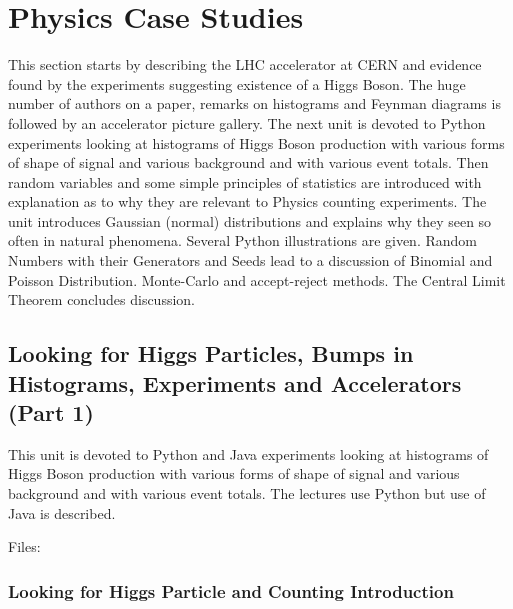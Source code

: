 

\section{Physics Case Studies}\label{physics-case-study}

\FILENAME

This section starts by describing the LHC accelerator at CERN and
evidence found by the experiments suggesting existence of a Higgs Boson.
The huge number of authors on a paper, remarks on histograms and Feynman
diagrams is followed by an accelerator picture gallery. The next unit is
devoted to Python experiments looking at histograms of Higgs Boson
production with various forms of shape of signal and various background
and with various event totals. Then random variables and some simple
principles of statistics are introduced with explanation as to why they
are relevant to Physics counting experiments. The unit introduces
Gaussian (normal) distributions and explains why they seen so often in
natural phenomena. Several Python illustrations are given. Random
Numbers with their Generators and Seeds lead to a discussion of Binomial
and Poisson Distribution. Monte-Carlo and accept-reject methods. The
Central Limit Theorem concludes discussion.

\subsection{Looking for Higgs Particles, Bumps in Histograms,
Experiments and Accelerators (Part
1)}\label{looking-for-higgs-particles-bumps-in-histograms-experiments-and-accelerators-part-1}

This unit is devoted to Python and Java experiments looking at
histograms of Higgs Boson production with various forms of shape of
signal and various background and with various event totals. The
lectures use Python but use of Java is described.


Files:


\subsubsection{Looking for Higgs Particle and Counting
Introduction}\label{looking-for-higgs-particle-and-counting-introduction}

